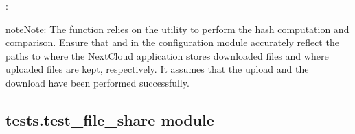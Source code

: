 \documentclass[letterpaper,10pt,english]{sphinxmanual}
\begin{document}
\begin{fulllineitems}
\begin{quote}
\begin{description}
\end{description}\end{quote}

\sphinxAtStartPar
{}:

\begin{sphinxVerbatim}[commandchars=\\\{\}]
  
  
 
    
    
\end{sphinxVerbatim}

\begin{sphinxadmonition}{note}{Note:}
\sphinxAtStartPar
The function relies on the  utility to perform the hash computation and comparison. Ensure
that  and  in the configuration module accurately reflect the
paths to where the NextCloud application stores downloaded files and where uploaded files are kept,
respectively. It assumes that the upload and the download have been performed successfully.
\end{sphinxadmonition}

\end{fulllineitems}



\subsection{tests.test\_file\_share module}
\label{\detokenize{tests:module-tests.test_file_share}}\label{\detokenize{tests:tests-test-file-share-module}}
\end{document}

